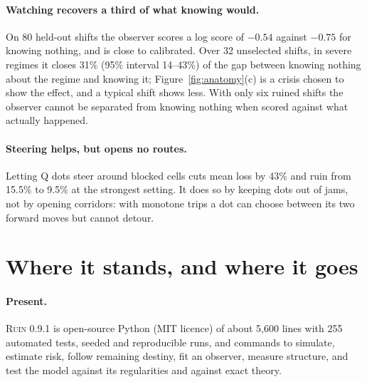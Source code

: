 \documentclass[10pt,twocolumn,a4paper]{article}
\newcommand{\ruin}{\textsc{Ruin}}
\begin{document}
\paragraph{Watching recovers a third of what knowing would.} On 80 held-out shifts the observer scores a log score of $-0.54$ against $-0.75$ for knowing nothing, and is close to calibrated. Over 32 unselected shifts, in severe regimes it closes 31\% (95\% interval 14--43\%) of the gap between knowing nothing about the regime and knowing it; Figure~\ref{fig:anatomy}(c) is a crisis chosen to show the effect, and a typical shift shows less. With only six ruined shifts the observer cannot be separated from knowing nothing when scored against what actually happened.

\paragraph{Steering helps, but opens no routes.} Letting Q dots steer around blocked cells cuts mean loss by 43\% and ruin from 15.5\% to 9.5\% at the strongest setting. It does so by keeping dots out of jams, not by opening corridors: with monotone trips a dot can choose between its two forward moves but cannot detour.

\section{Where it stands, and where it goes}
\paragraph{Present.} \ruin{} 0.9.1 is open-source Python (MIT licence) of about 5,600 lines with 255 automated tests, seeded and reproducible runs, and commands to simulate, estimate risk, follow remaining destiny, fit an observer, measure structure, and test the model against its regularities and against exact theory.
\end{document}
